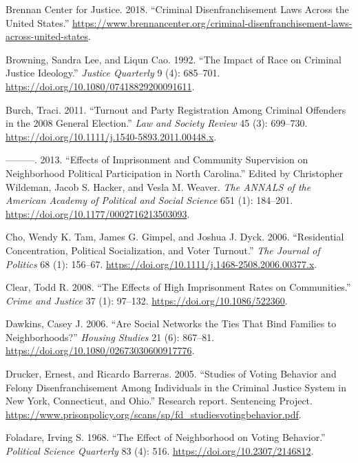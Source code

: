 \documentclass[12pt,]{article}
\begin{document}
\leavevmode\hypertarget{ref-bcj_laws}{}%
Brennan Center for Justice. 2018. ``Criminal Disenfranchisement Laws Across the United States.'' \url{https://www.brennancenter.org/criminal-disenfranchisement-laws-across-united-states}.

\leavevmode\hypertarget{ref-Browning1992}{}%
Browning, Sandra Lee, and Liqun Cao. 1992. ``The Impact of Race on Criminal Justice Ideology.'' \emph{Justice Quarterly} 9 (4): 685--701. \url{https://doi.org/10.1080/07418829200091611}.

\leavevmode\hypertarget{ref-Burch2011}{}%
Burch, Traci. 2011. ``Turnout and Party Registration Among Criminal Offenders in the 2008 General Election.'' \emph{Law and Society Review} 45 (3): 699--730. \url{https://doi.org/10.1111/j.1540-5893.2011.00448.x}.

\leavevmode\hypertarget{ref-Burch2013}{}%
---------. 2013. ``Effects of Imprisonment and Community Supervision on Neighborhood Political Participation in North Carolina.'' Edited by Christopher Wildeman, Jacob S. Hacker, and Vesla M. Weaver. \emph{The ANNALS of the American Academy of Political and Social Science} 651 (1): 184--201. \url{https://doi.org/10.1177/0002716213503093}.

\leavevmode\hypertarget{ref-Cho2006}{}%
Cho, Wendy K. Tam, James G. Gimpel, and Joshua J. Dyck. 2006. ``Residential Concentration, Political Socialization, and Voter Turnout.'' \emph{The Journal of Politics} 68 (1): 156--67. \url{https://doi.org/10.1111/j.1468-2508.2006.00377.x}.

\leavevmode\hypertarget{ref-Clear2008}{}%
Clear, Todd R. 2008. ``The Effects of High Imprisonment Rates on Communities.'' \emph{Crime and Justice} 37 (1): 97--132. \url{https://doi.org/10.1086/522360}.

\leavevmode\hypertarget{ref-Dawkins2006}{}%
Dawkins, Casey J. 2006. ``Are Social Networks the Ties That Bind Families to Neighborhoods?'' \emph{Housing Studies} 21 (6): 867--81. \url{https://doi.org/10.1080/02673030600917776}.

\leavevmode\hypertarget{ref-Drucker2005}{}%
Drucker, Ernest, and Ricardo Barreras. 2005. ``Studies of Voting Behavior and Felony Disenfranchisement Among Individuals in the Criminal Justice System in New York, Connecticut, and Ohio.'' Research report. Sentencing Project. \url{https://www.prisonpolicy.org/scans/sp/fd_studiesvotingbehavior.pdf}.

\leavevmode\hypertarget{ref-Foladare1968}{}%
Foladare, Irving S. 1968. ``The Effect of Neighborhood on Voting Behavior.'' \emph{Political Science Quarterly} 83 (4): 516. \url{https://doi.org/10.2307/2146812}.
\end{document}
